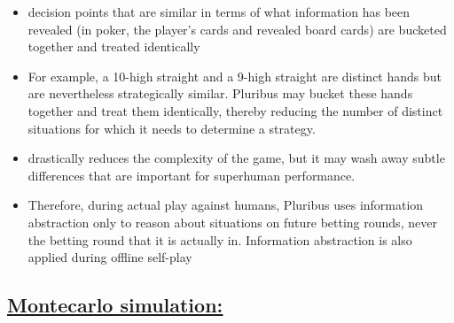 \documentclass[
]{article}
\begin{document}
\begin{itemize}
\item
  decision points that are similar in terms of what information has been
  revealed (in poker, the player's cards and revealed board cards) are
  bucketed together and treated identically
\item
  For example, a 10-high straight and a 9-high straight are distinct
  hands but are nevertheless strategically similar. Pluribus may bucket
  these hands together and treat them identically, thereby reducing the
  number of distinct situations for which it needs to determine a
  strategy.
\item
  drastically reduces the complexity of the game, but it may wash away
  subtle differences that are important for superhuman performance.
\item
  Therefore, during actual play against humans, Pluribus uses
  information abstraction only to reason about situations on future
  betting rounds, never the betting round that it is actually in.
  Information abstraction is also applied during offline self-play
\end{itemize}

\subsection{\texorpdfstring{\href{https://aws.amazon.com/what-is/monte-carlo-simulation/}{\ul{Montecarlo
simulation:}}}{Montecarlo simulation:}}\label{montecarlo-simulation}
\end{document}
